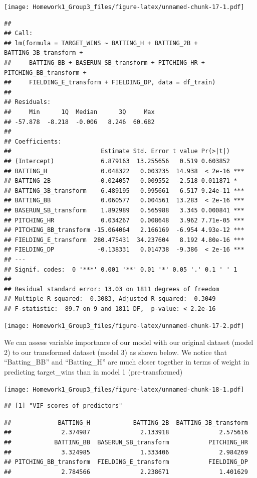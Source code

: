 \documentclass[
]{article}
\begin{document}
\texttt{[image: Homework1\_Group3\_files/figure-latex/unnamed-chunk-17-1.pdf]}

\begin{verbatim}
## 
## Call:
## lm(formula = TARGET_WINS ~ BATTING_H + BATTING_2B + BATTING_3B_transform + 
##     BATTING_BB + BASERUN_SB_transform + PITCHING_HR + PITCHING_BB_transform + 
##     FIELDING_E_transform + FIELDING_DP, data = df_train)
## 
## Residuals:
##     Min      1Q  Median      3Q     Max 
## -57.878  -8.218  -0.006   8.246  60.682 
## 
## Coefficients:
##                         Estimate Std. Error t value Pr(>|t|)    
## (Intercept)             6.879163  13.255656   0.519 0.603852    
## BATTING_H               0.048322   0.003235  14.938  < 2e-16 ***
## BATTING_2B             -0.024057   0.009552  -2.518 0.011871 *  
## BATTING_3B_transform    6.489195   0.995661   6.517 9.24e-11 ***
## BATTING_BB              0.060577   0.004561  13.283  < 2e-16 ***
## BASERUN_SB_transform    1.892989   0.565988   3.345 0.000841 ***
## PITCHING_HR             0.034267   0.008648   3.962 7.71e-05 ***
## PITCHING_BB_transform -15.064064   2.166169  -6.954 4.93e-12 ***
## FIELDING_E_transform  280.475431  34.237604   8.192 4.80e-16 ***
## FIELDING_DP            -0.138331   0.014738  -9.386  < 2e-16 ***
## ---
## Signif. codes:  0 '***' 0.001 '**' 0.01 '*' 0.05 '.' 0.1 ' ' 1
## 
## Residual standard error: 13.03 on 1811 degrees of freedom
## Multiple R-squared:  0.3083, Adjusted R-squared:  0.3049 
## F-statistic:  89.7 on 9 and 1811 DF,  p-value: < 2.2e-16
\end{verbatim}

\texttt{[image: Homework1\_Group3\_files/figure-latex/unnamed-chunk-17-2.pdf]}

We can assess variable importance of our model with our original dataset
(model 2) to our transformed dataset (model 3) as shown below. We notice
that ``Batting\_BB'' and ``Batting\_H'' are much closer together in
terms of weight in predicting target\_wins than in model 1
(pre-transformed)

\texttt{[image: Homework1\_Group3\_files/figure-latex/unnamed-chunk-18-1.pdf]}

\begin{verbatim}
## [1] "VIF scores of predictors"
\end{verbatim}

\begin{verbatim}
##             BATTING_H            BATTING_2B  BATTING_3B_transform 
##              2.374987              2.133918              2.575616 
##            BATTING_BB  BASERUN_SB_transform           PITCHING_HR 
##              3.324985              1.333406              2.984269 
## PITCHING_BB_transform  FIELDING_E_transform           FIELDING_DP 
##              2.784566              2.238671              1.401629
\end{verbatim}
\end{document}
